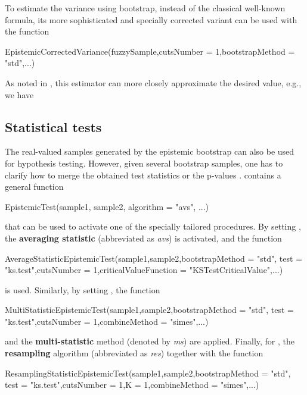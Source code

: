 To estimate the variance using bootstrap, instead of the classical well-known formula, its more sophisticated and specially corrected variant \citep{pgmr2022} can be used with the function
\begin{example}
EpistemicCorrectedVariance(fuzzySample,cutsNumber = 1,bootstrapMethod = "std",...)
\end{example}
As noted in \cite{pgmr2022}, this estimator can more closely approximate the desired value, e.g., we have
\subsection{Statistical tests}
The real-valued samples generated by the epistemic bootstrap can also be used for hypothesis testing. 
However, given several bootstrap samples, one has to clarify how to merge the obtained test statistics or the p-values \citep{10.1007/978-3-031-08974-9_39}.
 contains a general function 
\begin{example}
EpistemicTest(sample1, sample2, algorithm = "avs", ...)
\end{example}
that can be used to activate one of the specially tailored procedures.
By setting , the \textbf{averaging statistic} (abbreviated as \emph{avs}) is activated, and the function
\begin{example}
AverageStatisticEpistemicTest(sample1,sample2,bootstrapMethod = "std",
  test = "ks.test",cutsNumber = 1,criticalValueFunction = "KSTestCriticalValue",...)
\end{example}
is used.
Similarly, by setting , the function
\begin{example}
MultiStatisticEpistemicTest(sample1,sample2,bootstrapMethod = "std",
  test = "ks.test",cutsNumber = 1,combineMethod = "simes",...)
\end{example}
and the \textbf{multi-statistic} method (denoted by \emph{ms}) are applied.
Finally, for , the \textbf{resampling} algorithm (abbreviated as \emph{res}) together with the function
\begin{example}
ResamplingStatisticEpistemicTest(sample1,sample2,bootstrapMethod = "std",
  test = "ks.test",cutsNumber = 1,K = 1,combineMethod = "simes",...)
\end{example}
